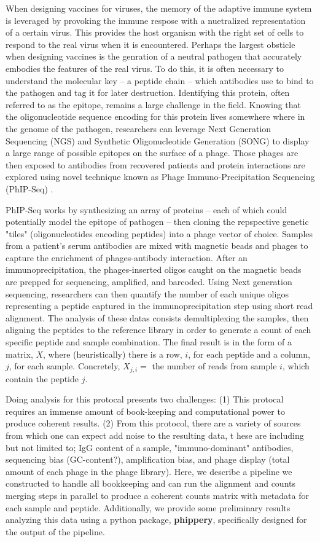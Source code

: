 \documentclass{article}
\begin{document}
When designing vaccines for viruses, the memory of the adaptive immune system is leveraged by provoking the immune respose with a nuetralized representation of a certain virus.
This provides the host organism with the right set of cells to respond to the real virus when it is encountered. 
Perhaps the largest obsticle when designing vaccines is the genration of a neutral pathogen that accurately embodies the features of the real virus.
To do this, it is often necessary to understand the molecular key -- a peptide chain -- which antibodies use to bind to the pathogen and tag it for later destruction.
Identifying this protein, often referred to as the epitope, remains a large challenge in the field. 
Knowing that the oligonucleotide sequence encoding for this protein lives somewhere where in the genome of the pathogen,
researchers can leverage Next Generation Sequencing (NGS) and Synthetic Oligonucleotide Generation (SONG)
to display a large range of possible epitopes on the surface of a phage.
Those phages are then exposed to antibodies from recovered patients and protein interactions are explored using novel technique known as 
Phage Immuno-Precipitation Sequencing (PhIP-Seq) \cite{Larman2011}.

PhIP-Seq works by synthesizing an array of proteins -- each of which could potentially model the epitope of pathogen -- 
then cloning the repspective genetic "tiles" (oligonucleotides encoding peptides) into a phage vector of choice. 
Samples from a patient's serum antibodies are mixed with magnetic beads and phages to capture the enrichment of phages-antibody interaction.
After an immunoprecipitation, the phages-inserted oligos caught on the magnetic beads are prepped for sequencing, amplified, and barcoded. 
Using Next generation sequencing, 
researchers can then quantify the number of each unique oligos representing a peptide captured in the immunoprecipitation step using short read alignment. 
The analysis of these datas consists demultiplexing the samples,
then aligning the peptides to the reference library in order to generate a count of each specific peptide and sample combination. 
The final result is in the form of a matrix, $X$, where (heuristically) there is a row, $i$, for each peptide and a column, $j$, for each sample.
Concretely, $X_{j,i} =$ the number of reads from sample $i$, which contain the peptide $j$.

Doing analysis for this protocal presents two challenges:
(1) This protocal requires an immense amount of book-keeping and computational power to produce coherent results.
(2) From this protocol, there are a variety of sources from which one can expect add noise to the resulting data, t
hese are including but not limited to; 
IgG content of a sample, "immuno-dominant" antibodies, sequencing bias (GC-content?), amplification bias, and phage display (total amount of each phage in the phage library). 
Here, we describe a pipeline we constructed to handle all bookkeeping and can run the alignment and counts merging steps in parallel to produce a coherent counts matrix with metadata for each sample and peptide.
Additionally, we provide some preliminary results analyzing this data using a python package, \textbf{phippery}, specifically designed for the output of the pipeline.
\end{document}
